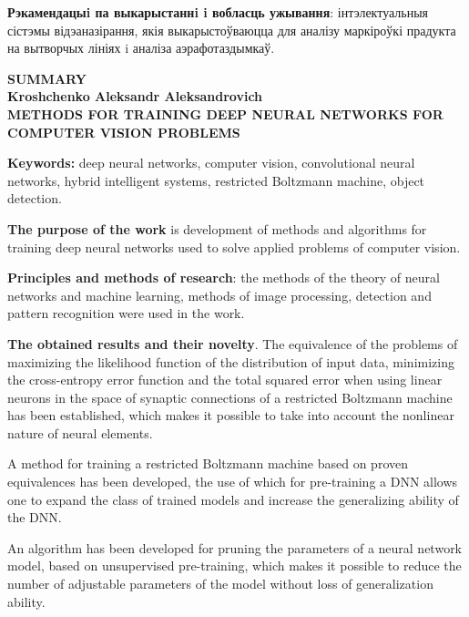 \documentclass{thesisby}
\begin{document}
	
\textbf{Рэкамендацыi па выкарыстаннi i вобласць ужывання}:
інтэлектуальныя сістэмы відэаназірання, якія выкарысто\u{у}ваюцца для аналізу маркіро\u{у}кі прадукта на вытворчых лініях i аналіза аэрафотаздымка\u{у}.

\newpage
\begin{center}
\bf SUMMARY\\[1mm]\rm Kroshchenko Aleksandr Aleksandrovich\\[1mm] \bf
METHODS FOR TRAINING DEEP NEURAL NETWORKS FOR COMPUTER VISION PROBLEMS
\end{center}

{\bf Keywords:} deep neural networks, computer vision, convolutional neural networks, hybrid intelligent systems, restricted Boltzmann machine, object detection.

\textbf{The purpose of the work } is development of methods and algorithms for training deep neural networks used to solve applied problems of computer vision.

\textbf{Principles and methods of research}: the methods of the theory of neural networks and machine learning, methods of image processing, detection and pattern recognition were used in the work.

\textbf{The obtained results and their novelty}.
The equivalence of the problems of maximizing the likelihood function of the distribution of input data, minimizing the cross-entropy error function and the total squared error when using linear neurons in the space of synaptic connections of a restricted Boltzmann machine has been established, which makes it possible to take into account the nonlinear nature of neural elements.

A method for training a restricted Boltzmann machine based on proven equivalences has been developed, the use of which for pre-training a DNN allows one to expand the class of trained models and increase the generalizing ability of the DNN.

An algorithm has been developed for pruning the parameters of a neural network model, based on unsupervised pre-training, which makes it possible to reduce the number of adjustable parameters of the model without loss of generalization ability.
\end{document}
